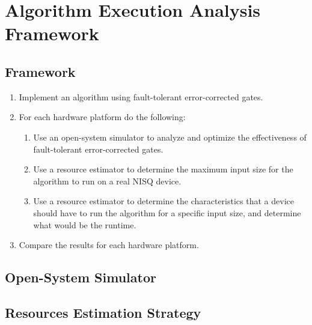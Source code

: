 %
%
\chapter {Algorithm Execution Analysis Framework}

\section{Framework}



\begin{enumerate}
    \item Implement an algorithm using fault-tolerant error-corrected gates.
    \item For each hardware platform do the following:
    \begin{enumerate}
        \item Use an open-system simulator to analyze and optimize the effectiveness of fault-tolerant error-corrected gates.
        \item Use a resource estimator to determine the maximum input size for the algorithm to run on a real NISQ device.
        \item Use a resource estimator to determine the characteristics that a device should have to run the algorithm for a specific input size, and determine what would be the runtime.
    \end{enumerate}
    \item Compare the results for each hardware platform.
\end{enumerate}


\section{Open-System Simulator}


\section{Resources Estimation Strategy}

